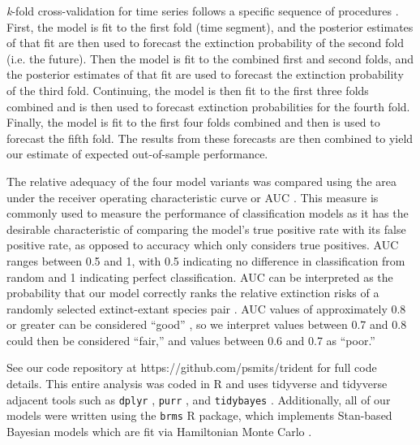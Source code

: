 \documentclass[12pt,letterpaper]{article}
\begin{document}
\begin{refsection}
\textit{k}-fold cross-validation for time series follows a specific sequence of procedures \citep{Arlot2010,Bergmeir2016}. First, the model is fit to the first fold (time segment), and the posterior estimates of that fit are then used to forecast the extinction probability of the second fold (i.e. the future). Then the model is fit to the combined first and second folds, and the posterior estimates of that fit are used to forecast the extinction probability of the third fold. Continuing, the model is then fit to the first three folds combined and is then used to forecast extinction probabilities for the fourth fold. Finally, the model is fit to the first four folds combined and then is used to forecast the fifth fold. The results from these forecasts are then combined to yield our estimate of expected out-of-sample performance.

The relative adequacy of the four model variants was compared using the area under the receiver operating characteristic curve or AUC \citep{Fawcett2006,Mason2002}. This measure is commonly used to measure the performance of classification models as it has the desirable characteristic of comparing the model's true positive rate with its false positive rate, as opposed to accuracy which only considers true positives. AUC ranges between 0.5 and 1, with 0.5 indicating no difference in classification from random and 1 indicating perfect classification. AUC can be interpreted as the probability that our model correctly ranks the relative extinction risks of a randomly selected extinct-extant species pair \citep{Fawcett2006,Mason2002}. AUC values of approximately 0.8 or greater can be considered ``good'' \citep{ACCDA}, so we interpret values between 0.7 and 0.8 could then be considered ``fair,'' and values between 0.6 and 0.7 as ``poor.''


See our code repository at https://github.com/psmits/trident for full code details. This entire analysis was coded in R and uses tidyverse and tidyverse adjacent tools such as \texttt{dplyr} \citep{dplyr}, \texttt{purr} \citep{purrr}, and \texttt{tidybayes} \citep{tidybayes}. Additionally, all of our models were written using the \texttt{brms} \citep{brms2017,brms2018} R package, which implements Stan-based Bayesian models which are fit via Hamiltonian Monte Carlo \citep{StanManual}.



\end{refsection}
\end{document}
